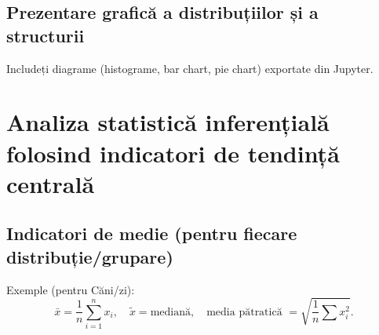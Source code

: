 \documentclass[12pt,a4paper]{report}
\begin{document}
\subsection{Prezentare grafică a distribuțiilor și a structurii}
Includeți diagrame (histograme, bar chart, pie chart) exportate din Jupyter.



\section{Analiza statistică inferențială folosind indicatori de tendință centrală}

\subsection{Indicatori de medie (pentru fiecare distribuție/grupare)}
Exemple (pentru Căni/zi):
$$
\bar{x} = \frac{1}{n}\sum_{i=1}^{n} x_i, \quad 
\tilde{x}=\text{mediană}, \quad
\text{media pătratică } = \sqrt{\frac{1}{n}\sum x_i^2}.
$$
\
\end{document}
